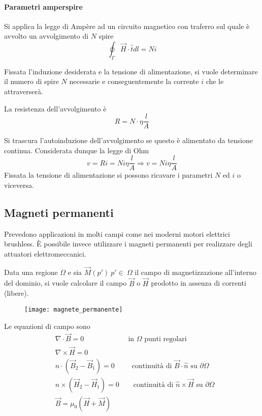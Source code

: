 \paragraph{Parametri amperspire}
Si applica la legge di Ampère ad un circuito magnetico con traferro sul quale è avvolto
un avvolgimento di $N$ spire
$$
\oint_\Gamma \vec{H}\cdot\hat{t}dl = Ni
$$

Fissata l'induzione desiderata e la tensione di alimentazione, si vuole 
determinare il numero di spire $N$ necessarie e conseguentemente la corrente 
$i$ che le attraverserà.

La resistenza dell'avvolgimento è 
$$
R = N\cdot \eta\frac{l}{A}
$$

Si trascura l'autoinduzione dell'avvolgimento se questo è alimentato da tensione continua.
Considerata dunque la legge di Ohm
$$
v = Ri = Ni\eta\frac{l}{A} \Rightarrow v = Ni \eta \frac{l}{A}
$$
Fissata la tensione di alimentazione si possono ricavare i parametri $N$ ed $i$ o viceversa.

\subsection{Magneti permanenti}
Prevedono applicazioni in molti campi come nei moderni motori elettrici brushless.
È possibile invece utilizzare i magneti permanenti per realizzare degli attuatori
elettromeccanici.

Data una regione $\Omega$ e sia $\vec{M}(p')\ p'\in\ \Omega$ il campo di magnetizzazione
all'interno del dominio, si vuole calcolare il campo $\vec{B}$ o $\vec{H}$ prodotto
in assenza di correnti (libere).
\begin{figure}[H]
\centering
\texttt{[image: magnete\_permanente]}
\end{figure}
Le equazioni di campo sono
$$
\begin{aligned}
&\nabla\cdot\vec{B} = 0\qquad\qquad\qquad\  \text{in }\Omega \text{ punti regolari} \\
&\nabla\times\vec{H} =  0\\
&\hat{n}\cdot\left(\vec{B}_2-\vec{B}_1\right) = 0\qquad\ \ \text{continuità di }\vec{B}\cdot\hat{n}\text{ su }\partial\Omega \\
&\hat{n}\times\left(\vec{H}_2-\vec{H}_1\right) = 0\qquad \text{continuità di }\hat{n}\times\vec{H}\text{ su }\partial\Omega\\
&\vec{B} = \mu_0\left(\vec{H}+\vec{M}\right)
\end{aligned}
$$

